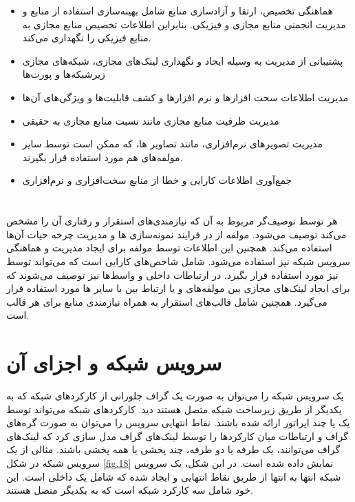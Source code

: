 \begin{itemize}
    \item
    هماهنگی تخصیص، ارتقا و آزادسازی منابع  شامل بهینه‌‌سازی استفاده از منابع و مدیریت انجمنی منابع مجازی و فیزیکی.
    بنابراین  اطلاعات  تخصیص منابع مجازی به منابع فیزیکی را نگهداری می‌کند.
    \item
    پشتیبانی از مدیریت  به وسیله ایجاد و نگهداری لینک‌های مجازی،
    شبکه‌های مجازی زیرشبکه‌ها و پورت‌ها
    \item
    مدیریت اطلاعات  سخت افزارها و نرم افزارها و کشف قابلیت‌ها و ویژگی‌های آن‌ها
    \item
    مدیریت ظرفیت منابع مجازی مانند نسبت منابع مجازی به حقیقی
    \item
    مدیریت تصویرهای نرم‌افزاری، مانند تصاویر ها، که ممکن است توسط سایر مولفه‌های  هم مورد استفاده قرار بگیرند.
    \item
    جمع‌آوری اطلاعات کارایی و خطا از منابع سخت‌افزاری و نرم‌افزاری
\end{itemize}

\section{}

هر  توسط توصیف‌گر مربوط به آن که نیازمندی‌های استقرار و رفتاری آن را مشخص می‌کند توصیف می‌شود.
مولفه  از  در فرایند نمونه‌سازی ‌ها و مدیریت چرخه حیات آن‌ها استفاده می‌کند.
همچنین این اطلاعات توسط مولفه  برای ایجاد مدیریت و هماهنگی سرویس شبکه نیز استفاده می‌شود.
 شامل شاخص‌های کارایی است که می‌تواند توسط  نیز مورد استفاده قرار بگیرد.
در  ارتباطات داخلی و واسط‌ها نیز توصیف می‌شوند که
برای ایجاد لینک‌های مجازی بین مولفه‌های  و یا ارتباط بین  با سایر ‌ها مورد استفاده قرار می‌گیرد.
 همچنین شامل قالب‌های استقرار  به همراه نیازمندی منابع برای هر قالب است.

\section{سرویس شبکه و اجزای آن}
یک سرویس شبکه را می‌توان به صورت یک گراف جلورانی از کارکردهای شبکه
که به یکدیگر از طریق زیرساخت شبکه متصل هستند دید.
کارکردهای شبکه می‌تواند توسط یک یا چند اپراتور ارائه شده باشند.
نقاط انتهایی سرویس را می‌توان به صورت گره‌های گراف و
ارتباطات میان کارکردها را توسط لینک‌های گراف مدل سازی کرد
که لینک‌های گراف می‌توانند، یک طرفه یا دو طرفه، چند پخشی یا همه پخشی باشند.
مثالی از یک سرویس شبکه در شکل
\ref{fig.18}
نمایش داده شده است.
در این شکل، یک سرویس شبکه انتها به انتها از طریق نقاط انتهایی  و  ایجاد شده که شامل یک  داخلی است.
این  خود شامل سه کارکرد شبکه است که به یکدیگر متصل هستند.


